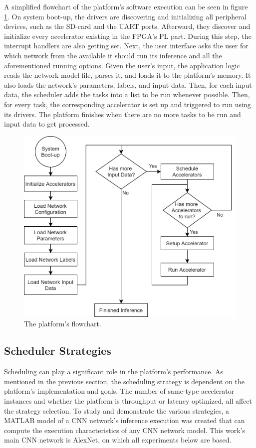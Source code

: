A simplified flowchart of the platform's software execution can be seen in figure \ref{fig:platform-flowchart}. On system boot-up, the drivers are discovering and initializing all peripheral devices, such as the SD-card and the UART ports. Afterward, they discover and initialize every accelerator existing in the FPGA's PL part. During this step, the interrupt handlers are also getting set. Next, the user interface asks the user for which network from the available it should run its inference and all the aforementioned running options. Given the user's input, the application logic reads the network model file, parses it, and loads it to the platform's memory. It also loads the network's parameters, labels, and input data. Then, for each input data, the scheduler adds the tasks into a list to be run whenever possible. Then, for every task, the corresponding accelerator is set up and triggered to run using its drivers. The platform finishes when there are no more tasks to be run and input data to get processed.

\begin{figure} [H]
	\centering
	\includegraphics[width=\textwidth]{Images/Platform/PlatformFlowchart.png}
	\decoRule
	\caption[The platform's flowchart]{The platform's flowchart.}
	\label{fig:platform-flowchart}
\end{figure}

\subsection{Scheduler Strategies}
\label{sec:Scheduler-Strategies}
Scheduling can play a significant role in the platform's performance. As mentioned in the previous section, the scheduling strategy is dependent on the platform's implementation and goals. The number of same-type accelerator instances and whether the platform is throughput or latency optimized, all affect the strategy selection. To study and demonstrate the various strategies, a MATLAB model of a CNN network's inference execution was created that can compute the execution characteristics of any CNN network model. This work's main CNN network is AlexNet, on which all experiments below are based.

